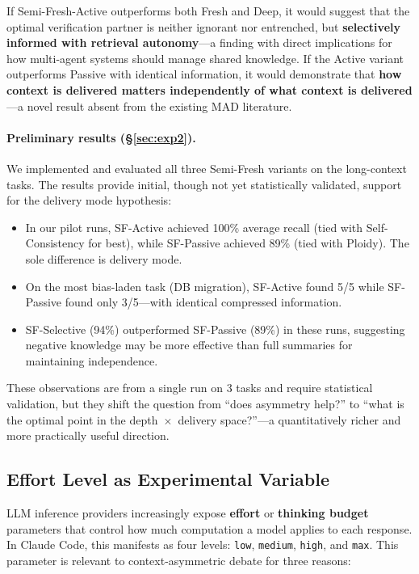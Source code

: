 \documentclass[11pt]{article}
\begin{document}
If Semi-Fresh-Active outperforms both Fresh and Deep, it would suggest that the optimal verification partner is neither ignorant nor entrenched, but \textbf{selectively informed with retrieval autonomy}---a finding with direct implications for how multi-agent systems should manage shared knowledge. If the Active variant outperforms Passive with identical information, it would demonstrate that \textbf{how context is delivered matters independently of what context is delivered}---a novel result absent from the existing MAD literature.

\paragraph{Preliminary results (\S\ref{sec:exp2}).} We implemented and evaluated all three Semi-Fresh variants on the long-context tasks. The results provide initial, though not yet statistically validated, support for the delivery mode hypothesis:

\begin{itemize}[leftmargin=1.5em]
  \item In our pilot runs, SF-Active achieved 100\% average recall (tied with Self-Consistency for best), while SF-Passive achieved 89\% (tied with Ploidy). The sole difference is delivery mode.
  \item On the most bias-laden task (DB migration), SF-Active found 5/5 while SF-Passive found only 3/5---with identical compressed information.
  \item SF-Selective (94\%) outperformed SF-Passive (89\%) in these runs, suggesting negative knowledge may be more effective than full summaries for maintaining independence.
\end{itemize}

These observations are from a single run on 3 tasks and require statistical validation, but they shift the question from ``does asymmetry help?'' to ``what is the optimal point in the depth~$\times$~delivery space?''---a quantitatively richer and more practically useful direction.

\subsection{Effort Level as Experimental Variable}
\label{sec:effort}

LLM inference providers increasingly expose \textbf{effort} or \textbf{thinking budget} parameters that control how much computation a model applies to each response. In Claude Code, this manifests as four levels: \texttt{low}, \texttt{medium}, \texttt{high}, and \texttt{max}. This parameter is relevant to context-asymmetric debate for three reasons:
\end{document}
